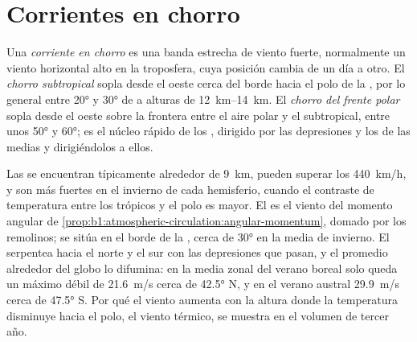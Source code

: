 \section{Corrientes en chorro}\label{sec:b1:atmospheric-circulation:jets}

\begin{definition}\label{def:b1:atmospheric-circulation:jet}
Una \emph{corriente en chorro} es una banda estrecha de viento fuerte, normalmente un viento horizontal alto en la troposfera, cuya posición cambia de un día a otro. El \emph{chorro subtropical} sopla desde el oeste cerca del borde hacia el polo de la , por lo general entre \ang{20} y \ang{30} de  a alturas de \qtyrange{12}{14}{km}. El \emph{chorro del frente polar} sopla desde el oeste sobre la frontera entre el aire polar y el subtropical, entre unos \ang{50} y \ang{60}; es el núcleo rápido de los , dirigido por las depresiones y los  de las  medias y dirigiéndolos a ellos.
\end{definition}

Las  se encuentran típicamente alrededor de \qty{9}{km}, pueden superar los \qty{440}{km/h}, y son más fuertes en el invierno de cada hemisferio, cuando el contraste de temperatura entre los trópicos y el polo es mayor. El  es el viento del momento angular de \cref{prop:b1:atmospheric-circulation:angular-momentum}, domado por los remolinos; se sitúa en el borde de la , cerca de \ang{30} en la media de invierno. El  serpentea hacia el norte y el sur con las depresiones que pasan, y el promedio alrededor del globo lo difumina: en la media zonal del verano boreal solo queda un máximo débil de \qty{21.6}{m/s} cerca de \ang{42.5} N, y en el verano austral \qty{29.9}{m/s} cerca de \ang{47.5} S. Por qué el viento aumenta con la altura donde la temperatura disminuye hacia el polo, el viento térmico, se muestra en el volumen de tercer año.

